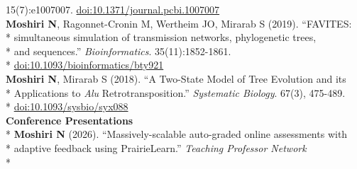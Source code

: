 \documentclass[margin,line]{res}
\begin{document}
\begin{resume}
\hspace*{8mm} 15(7):e1007007. \href{https://doi.org/10.1371/journal.pcbi.1007007}{doi:10.1371/journal.pcbi.1007007}\\
\hspace*{4mm} \textbf{Moshiri N}, Ragonnet-Cronin M, Wertheim JO, Mirarab S (2019). ``FAVITES:\\*
\hspace*{9.5mm} simultaneous simulation of transmission networks, phylogenetic trees,\\*
\hspace*{9.5mm} and sequences.'' \textit{Bioinformatics}. 35(11):1852-1861.\\*\vspace{2mm}
\hspace*{8mm} \href{https://doi.org/10.1093/bioinformatics/bty921}{doi:10.1093/bioinformatics/bty921}\\
\hspace*{4mm} \textbf{Moshiri N}, Mirarab S (2018). ``A Two-State Model of Tree Evolution and its\\*
\hspace*{9.5mm} Applications to \textit{Alu} Retrotransposition.'' \textit{Systematic Biology}. 67(3), 475-489.\\*\vspace{2mm}
\hspace*{8mm} \href{https://doi.org/10.1093/sysbio/syx088}{doi:10.1093/sysbio/syx088}
~\\
\textbf{Conference Presentations}\vspace{2mm}\\*
\hspace*{4mm} \textbf{Moshiri N} (2026). ``Massively-scalable auto-graded online assessments with\\*
\hspace*{9.5mm} adaptive feedback using PrairieLearn.'' \textit{Teaching Professor Network}\\*\vspace{2mm}

\end{resume}
\end{document}
